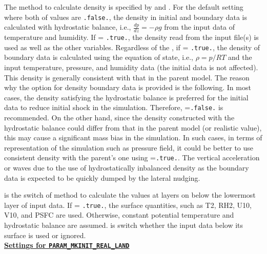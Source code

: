 The method to calculate density is specified by  and . 
For the default setting where both of values are \verb|.false.|, the density in initial and boundary data is calculated with hydrostatic balance, i.e., $\frac{dp}{dz}=-\rho g$ from the input data of temperature and humidity.
If  = \verb|.true.|, the density read from the input file(s) is used as well as the other variables. 
Regardless of the , if  = \verb|.true.|,
the density of boundary data is calculated using the equation of state, i.e., $\rho = p/RT$ and the input temperature, pressure, and humidity data (the initial data is not affected).
This density is generally consistent with that in the parent model. 
The reason why the option for density boundary data is provided is the following.
In most cases, the density satisfying the hydrostatic balance is preferred for the initial data to reduce initial shock in the simulation.
Therefore, =\verb|.false.| is recommended. 
On the other hand, since the density constructed with the hydrostatic balance could differ from that in the parent model (or realistic value), this may cause a significant mass bias in the simulation.
In such cases, in terms of representation of the simulation such as pressure field, it could be better to use consistent density with the parent's one using =\verb|.true.|.
The vertical acceleration or waves due to the use of hydrostatically inbalanced density as the boundary data is expected to be quickly dumped by the lateral nudging.


 is the switch of method to calculate the values at layers on \scale below the lowermost layer of input data.
If  = \verb|.true.|, the surface quantities, such as T2, RH2, U10, V10, and PSFC are used.
Otherwise, constant potential temperature and hydrostatic balance are assumed.
 is switch whether the input data below its surface is used or ignored.
\\

\noindent\textbf{\underline{Settings for \texttt{PARAM\_MKINIT\_REAL\_LAND}}}

